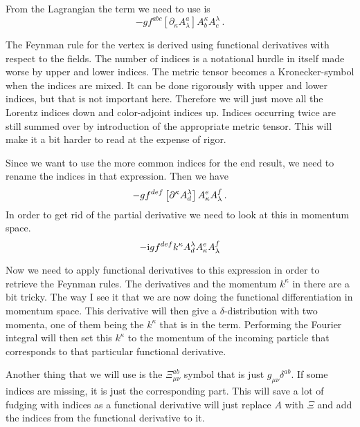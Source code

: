 \documentclass[11pt, english, fleqn, DIV=15, headinclude]{scrartcl}
\begin{document}
From the Lagrangian the term we need to use is
\[
    - g f^{abc} [\partial_\kappa A^a_\lambda] A^\kappa_b A^\lambda_c \,.
\]

The Feynman rule for the vertex is derived using functional derivatives with
respect to the fields. The number of indices is a notational hurdle in itself
made worse by upper and lower indices. The metric tensor becomes a
Kronecker-symbol when the indices are mixed. It can be done rigorously with
upper and lower indices, but that is not important here. Therefore we will just
move all the Lorentz indices down and color-adjoint indices up. Indices
occurring twice are still summed over by introduction of the appropriate metric
tensor. This will make it a bit harder to read at the expense of rigor.

Since we want to use the more common indices for the end result, we need to
rename the indices in that expression. Then we have
\[
    - g f^{def} \left[ \partial^\kappa A_d^\lambda \right] A_\kappa^e A_\lambda^f \,.
\]
In order to get rid of the partial derivative we need to look at this in
momentum space.
\[
    - \mathrm i g f^{def} k^\kappa A_d^\lambda A_\kappa^e A_\lambda^f
\]

Now we need to apply functional derivatives to this expression in order to
retrieve the Feynman rules. The derivatives and the momentum $k^\kappa$ in
there are a bit tricky. The way I see it that we are now doing the functional
differentiation in momentum space. This derivative will then give a
$\delta$-distribution with two momenta, one of them being the $k^\kappa$ that
is in the term. Performing the Fourier integral will then set this $k^\kappa$
to the momentum of the incoming particle that corresponds to that particular
functional derivative.

Another thing that we will use is the $\Xi_{\mu\nu}^{ab}$ symbol that is just
$g_{\mu\nu} \delta^{ab}$. If some indices are missing, it is just the
corresponding part. This will save a lot of fudging with indices as a
functional derivative will just replace $A$ with $\Xi$ and add the indices from
the functional derivative to it.
\end{document}
